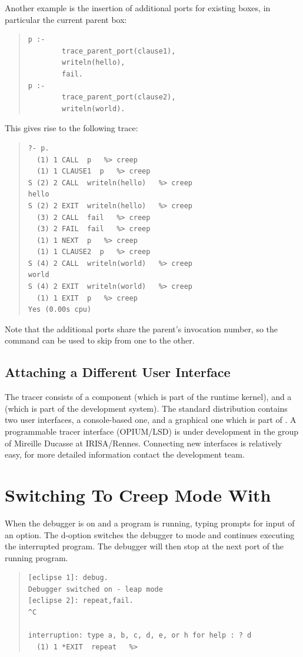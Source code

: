 Another example is the insertion of additional ports for existing boxes,
in particular the current parent box:
\begin{quote}
\begin{verbatim}
p :-
        trace_parent_port(clause1),
        writeln(hello),
        fail.
p :-
        trace_parent_port(clause2),
        writeln(world).
\end{verbatim}
\end{quote}
This gives rise to the following trace:
\begin{quote}
\begin{verbatim}
?- p.
  (1) 1 CALL  p   %> creep
  (1) 1 CLAUSE1  p   %> creep
S (2) 2 CALL  writeln(hello)   %> creep
hello
S (2) 2 EXIT  writeln(hello)   %> creep
  (3) 2 CALL  fail   %> creep
  (3) 2 FAIL  fail   %> creep
  (1) 1 NEXT  p   %> creep
  (1) 1 CLAUSE2  p   %> creep
S (4) 2 CALL  writeln(world)   %> creep
world
S (4) 2 EXIT  writeln(world)   %> creep
  (1) 1 EXIT  p   %> creep
Yes (0.00s cpu)
\end{verbatim}
\end{quote}
Note that the additional ports share the parent's invocation number,
so the  command can be used to skip from one to the other.


\subsection{Attaching a Different User Interface}

The tracer consists of a  component (which is part
of the
{\eclipse} runtime kernel), and a  (which is part of
the development system).  The standard {\eclipse} distribution contains two
user interfaces, a console-based one, and a graphical one which is part
of {\tkeclipse}.  A programmable tracer interface (OPIUM/LSD) is under
development in the group of Mireille Ducasse at IRISA/Rennes.
Connecting new interfaces is relatively easy, for more detailed
information contact the {\eclipse} development team.



\section{Switching To Creep Mode With }

When the debugger is on and a program is running, typing 
prompts for input of an option. The d-option switches the debugger to
 mode and continues executing the interrupted program.  The
debugger will then stop at the next port of the running program.
\begin{quote}
\begin{verbatim}
[eclipse 1]: debug.
Debugger switched on - leap mode
[eclipse 2]: repeat,fail.
^C

interruption: type a, b, c, d, e, or h for help : ? d
  (1) 1 *EXIT  repeat   %>
\end{verbatim}
\end{quote}

